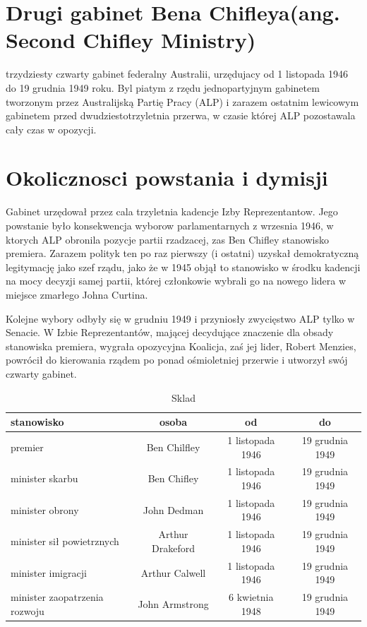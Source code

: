 \documentclass[a4paper,12pt]{article}
\title{}
\author{}
\begin{document}
\maketitle

\section {Drugi gabinet Bena Chifleya(ang. Second Chifley Ministry)} trzydziesty czwarty gabinet federalny Australii, urzędujacy od 1 listopada 1946 do 19 grudnia 1949 roku. Byl piatym z rzędu jednopartyjnym gabinetem tworzonym przez Australijską Partię Pracy (ALP) i zarazem ostatnim lewicowym gabinetem przed dwudziestotrzyletnia przerwa, w czasie której ALP pozostawala cały czas w opozycji.

\section {Okolicznosci powstania i dymisji}

Gabinet urzędował przez cala trzyletnia kadencje Izby Reprezentantow. Jego powstanie było konsekwencja wyborow parlamentarnych z wrzesnia 1946, w ktorych ALP obronila pozycje partii rzadzacej, zas Ben Chifley stanowisko premiera. Zarazem polityk ten po raz pierwszy (i ostatni) uzyskał demokratyczną legitymację jako szef rządu, jako że w 1945 objął to stanowisko w środku kadencji na mocy decyzji samej partii, której członkowie wybrali go na nowego lidera w miejsce zmarłego Johna Curtina.

Kolejne wybory odbyły się w grudniu 1949 i przyniosły zwycięstwo ALP tylko w Senacie. W Izbie Reprezentantów, mającej decydujące znaczenie dla obsady stanowiska premiera, wygrała opozycyjna Koalicja, zaś jej lider, Robert Menzies, powrócił do kierowania rządem po ponad ośmioletniej przerwie i utworzył swój czwarty gabinet.

\begin{table}
\begin{tabular}{lccc}
\hline
\textbf{stanowisko}&\textbf{osoba}&\textbf{od}&\textbf{do}\\
\hline
premier&Ben Chilfley&1 listopada 1946 & 19 grudnia 1949\\
minister skarbu&Ben Chifley&1 listopada 1946&19 grudnia 1949\\
minister obrony&John Dedman&1 listopada 1946&19 grudnia 1949\\
minister sił powietrznych&Arthur Drakeford&1 listopada 1946&19 grudnia 1949\\
minister imigracji&Arthur Calwell&1 listopada 1946&19 grudnia 1949\\
minister zaopatrzenia rozwoju&John Armstrong&6 kwietnia 1948&19 grudnia 1949\\
\hline
\end{tabular}
\caption{Sklad}
\end{table}
\end{document}
